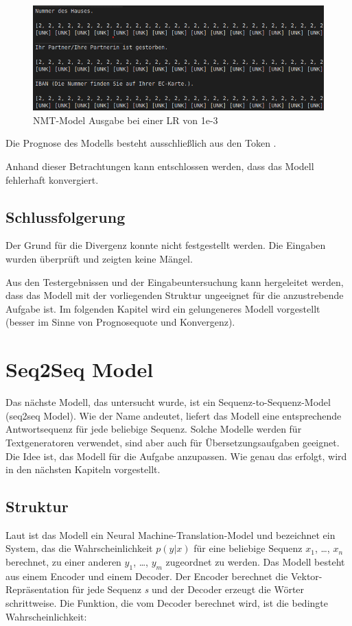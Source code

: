 \begin{figure}
	\centering
	\includegraphics[scale=0.7]{images/NMT_lr1e-3_Ausgabe.png}
	\caption{NMT-Model Ausgabe bei einer LR von 1e-3}
	\label{fig:NMT_Ausgabe1e-3}
\end{figure}

Die Prognose des Modells besteht ausschließlich aus den Token \text{\quotedblbase [UNK]\quotedblbase}.

Anhand dieser Betrachtungen kann entschlossen werden, dass das Modell fehlerhaft konvergiert.


\subsection{Schlussfolgerung}
Der Grund für die Divergenz konnte nicht festgestellt werden. Die Eingaben wurden überprüft und zeigten keine Mängel.

Aus den Testergebnissen und der Eingabeuntersuchung kann hergeleitet werden, dass das Modell mit der vorliegenden Struktur ungeeignet für die anzustrebende Aufgabe ist. Im folgenden Kapitel wird ein gelungeneres Modell vorgestellt (besser im Sinne von Prognosequote und Konvergenz).

\section{Seq2Seq Model}

Das nächste Modell, das untersucht wurde, ist ein Sequenz-to-Sequenz-Model (seq2seq Model). Wie der Name andeutet, liefert das Modell eine entsprechende Antwortsequenz für jede beliebige Sequenz. Solche Modelle werden für Textgeneratoren verwendet, sind aber auch für Übersetzungsaufgaben geeignet. Die Idee ist, das Modell für die Aufgabe  anzupassen. Wie genau das erfolgt, wird in den nächsten Kapiteln vorgestellt.

\subsection{Struktur}
Laut \cite{NMT&ATT:22} ist das Modell ein Neural Machine-Translation-Model und bezeichnet ein System, das die Wahrscheinlichkeit $p(y|x)$ für eine beliebige Sequenz $x_1$, \dots, $x_n$ berechnet, zu einer anderen $y_1$, \dots, $y_m$ zugeordnet zu werden. Das Modell besteht aus einem Encoder und einem Decoder. Der Encoder berechnet die Vektor-Repräsentation für jede Sequenz \textit{s} und der Decoder erzeugt die Wörter schrittweise. Die Funktion, die vom Decoder berechnet wird, ist die bedingte Wahrscheinlichkeit:

